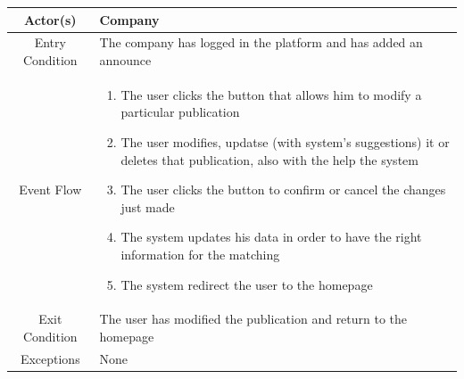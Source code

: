 \documentclass{article}
\begin{document}
\begin{table}[H]
    \centering
    \begin{tabular}{|c|p{10cm}|}
    \hline
        Actor(s)  & Company\\ 
    \hline
        Entry Condition &  
        The company has logged in the platform and has added an announce\\
    \hline
        Event Flow &
        \begin{enumerate}
            \item The user clicks the button that allows him to modify a particular publication 
            \item The user modifies, updatse (with system’s suggestions) it or deletes that publication, also with the help  the system
            \item The user clicks the button to confirm or cancel the changes just made
            \item The system updates his data in order to have the 
            right information for the matching 
            \item The system redirect the user to the homepage
        \end{enumerate}\\
    \hline
        Exit Condition & The user has modified the publication and return to the homepage\\
    \hline
        Exceptions &  None\\
    \hline
    \end{tabular}
    \label{tab:my_label}
\end{table}
\end{document}
